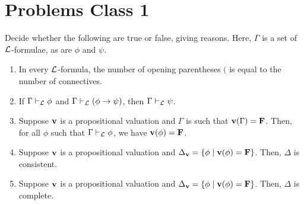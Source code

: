 \section*{Problems Class 1}
\setcounter{PC}{1}

\begin{boxproblem}
    Decide whether the following are true or false, giving reasons. Here, $\Gamma$ is a set of $\mathcal{L}$-formulae, as are $\phi$ and $\psi$.
    \begin{enumerate}[label = \normalfont \arabic*.]
        \item In every $\mathcal{L}$-formula, the number of opening parentheses $($ is equal to the number of connectives.
        
        \item If $\Gamma \vdash_{\mathcal{L}} \phi$ and $\Gamma \vdash_{\mathcal{L}} \left( \phi \to \psi \right)$, then $\Gamma \vdash_{\mathcal{L}} \psi$.
        
        \item Suppose $\mathbf{v}$ is a propositional valuation and $\Gamma$ is such that $\mathbf{v}\!\left( \Gamma \right) = \mathbf{F}$. Then, for all $\phi$ such that $\Gamma \vdash_{\mathcal{L}} \phi$, we have $\mathbf{v}\!\left( \phi \right) = \mathbf{F}$.
        
        \item Suppose $\mathbf{v}$ is a propositional valuation and $\Delta_{\mathbf{v}} = \left\{ \phi \; \middle\vert \; \mathbf{v}\!\left( \phi \right) = \mathbf{F} \right\}$. Then, $\Delta$ is consistent.
        
        \item Suppose $\mathbf{v}$ is a propositional valuation and $\Delta_{\mathbf{v}} = \left\{ \phi \; \middle\vert \; \mathbf{v}\!\left( \phi \right) = \mathbf{F} \right\}$. Then, $\Delta$ is complete.
    \end{enumerate}
\end{boxproblem}
